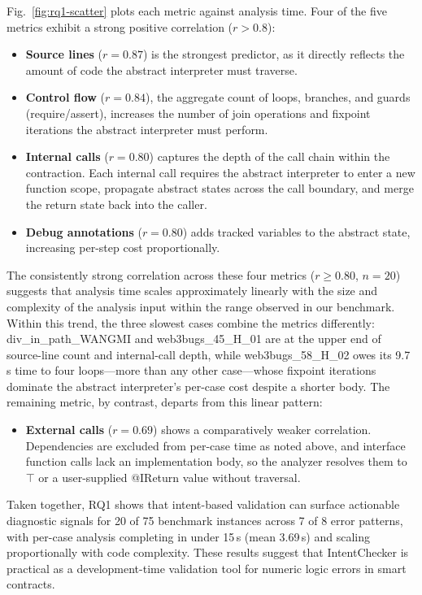 \documentclass[pdflatex,sn-basic]{sn-jnl}%
\theoremstyle{thmstyleone}%
\theoremstyle{thmstyletwo}%
\theoremstyle{thmstylethree}%
\begin{document}
Fig.~\ref{fig:rq1-scatter} plots each metric against analysis time.
Four of the five metrics exhibit a strong positive correlation ($r>0.8$):
\begin{itemize}
  \item \textbf{Source lines} ($r=0.87$) is the strongest predictor, as it directly reflects the amount of code the abstract interpreter must traverse.
  \item \textbf{Control flow} ($r=0.84$), the aggregate count of loops, branches, and guards (require/assert), increases the number of join operations and fixpoint iterations the abstract interpreter must perform.
  \item \textbf{Internal calls} ($r=0.80$) captures the depth of the call chain within the contraction. Each internal call requires the abstract interpreter to enter a new function scope, propagate abstract states across the call boundary, and merge the return state back into the caller.
  \item \textbf{Debug annotations} ($r=0.80$) adds tracked variables to the abstract state, increasing per-step cost proportionally.
\end{itemize}
The consistently strong correlation across these four metrics ($r \ge 0.80$, $n=20$) suggests that analysis time scales approximately linearly with the size and complexity of the analysis input within the range observed in our benchmark.
Within this trend, the three slowest cases combine the metrics differently: div\_in\_path\_WANGMI and web3bugs\_45\_H\_01 are at the upper end of source-line count and internal-call depth, while web3bugs\_58\_H\_02 owes its 9.7\,s time to four loops---more than any other case---whose fixpoint iterations dominate the abstract interpreter's per-case cost despite a shorter body.
The remaining metric, by contrast, departs from this linear pattern:
\begin{itemize}
  \item \textbf{External calls} ($r=0.69$) shows a comparatively weaker correlation. Dependencies are excluded from per-case time as noted above, and interface function calls lack an implementation body, so the analyzer resolves them to $\top$ or a user-supplied @IReturn value without traversal.
\end{itemize}

Taken together, RQ1 shows that intent-based validation can surface actionable diagnostic signals for 20 of 75 benchmark instances across 7 of 8 error patterns, with per-case analysis completing in under 15\,s (mean 3.69\,s) and scaling proportionally with code complexity.
These results suggest that IntentChecker is practical as a development-time validation tool for numeric logic errors in smart contracts.
\end{document}
